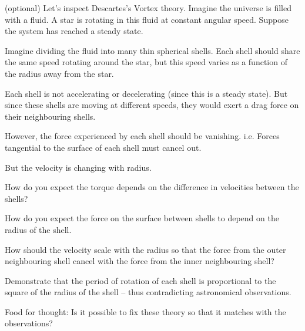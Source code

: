 \documentclass{article}
\begin{document}
\Needspace{12cm}
\begin{problem}
(optional) Let's inspect Descartes's Vortex theory. Imagine the universe is filled with a fluid. A star is rotating in this fluid at constant angular speed. Suppose the system has reached a steady state.

Imagine dividing the fluid into many thin spherical shells. Each shell should share the same speed rotating around the star, but this speed varies as a function of the radius away from the star.

Each shell is not accelerating or decelerating (since this is a steady state). But since these shells are moving at different speeds, they would exert a drag force on their neighbouring shells.

However, the force experienced by each shell should be vanishing. i.e. Forces tangential to the surface of each shell must cancel out.

But the velocity is changing with radius.

How do you expect the torque depends on the difference in velocities between the shells?

How do you expect the force on the surface between shells to depend on the radius of the shell.

How should the velocity scale with the radius so that the force from the outer neighbouring shell cancel with the force from the inner neighbouring shell?

Demonstrate that the period of rotation of each shell is proportional to the square of the radius of the shell -- thus contradicting astronomical observations.

Food for thought: Is it possible to fix these theory so that it matches with the observations?
\end{problem}
\end{document}
